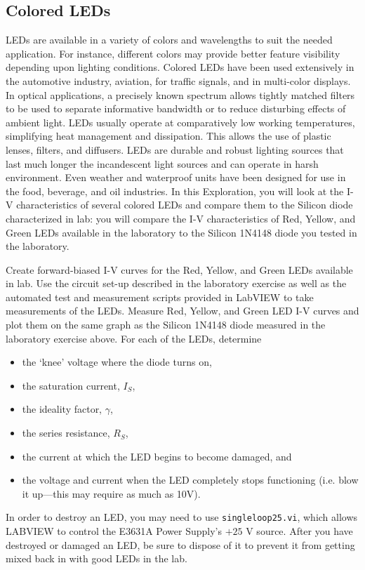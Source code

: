 \documentclass[12pt]{../manual}
\begin{document}
\newpage
\subsection{Colored LEDs}
LEDs are available in a variety of colors and wavelengths to suit the needed application. For instance, different colors may provide better feature visibility depending upon lighting conditions. Colored LEDs have been used extensively in the automotive industry, aviation, for traffic signals, and in multi-color displays. In optical applications, a precisely known spectrum allows tightly matched filters to be used to separate informative bandwidth or to reduce disturbing effects of ambient light. LEDs usually operate at comparatively low working temperatures, simplifying heat management and dissipation. This allows the use of plastic lenses, filters, and diffusers. LEDs are durable and robust lighting sources that last much longer the incandescent light sources and can operate in harsh environment. Even weather and waterproof units have been designed for use in the food, beverage, and oil industries. In this Exploration, you will look at the I-V characteristics of several colored LEDs and compare them to the Silicon diode characterized in lab: you will compare the I-V characteristics of Red, Yellow, and Green LEDs available in the laboratory to the Silicon 1N4148 diode you tested in the laboratory.

Create forward-biased I-V curves for the Red, Yellow, and Green LEDs available in lab. Use the circuit set-up described in the laboratory exercise as well as the automated test and measurement scripts provided in LabVIEW to take measurements of the LEDs. Measure Red, Yellow, and Green LED I-V curves and plot them on the same graph as the Silicon 1N4148 diode measured in the laboratory exercise above. For each of the LEDs, determine 
\begin{itemize}
\item the `knee' voltage where the diode turns on, 
\item the saturation current, $I_S$, 
\item the ideality factor, $\gamma$,
\item the series resistance, $R_S$,
\item the current at which the LED begins to become damaged, and 
\item the voltage and current when the LED completely stops functioning (i.e. blow it up---this may require as much as 10V). 
\end{itemize}
In order to destroy an LED, you may need to use {\tt singleloop25.vi}, which allows LABVIEW to control the E3631A Power Supply's $+25$ V source. After you have destroyed or damaged an LED, be sure to dispose of it to prevent it from getting mixed back in with good LEDs in the lab.
\end{document}
